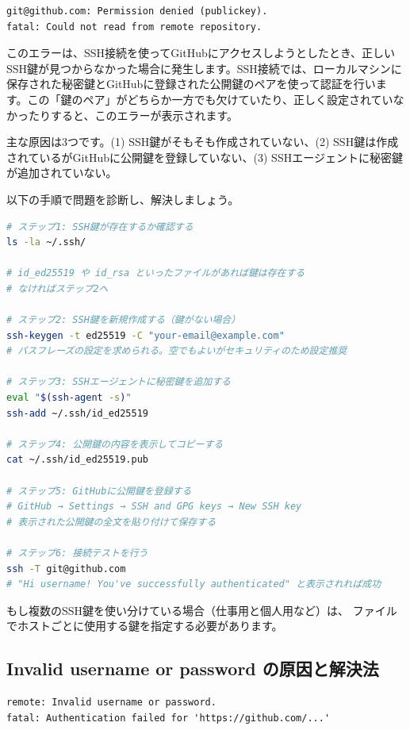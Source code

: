 \begin{lstlisting}[language={}]
git@github.com: Permission denied (publickey).
fatal: Could not read from remote repository.
\end{lstlisting}

このエラーは、SSH接続を使ってGitHubにアクセスしようとしたとき、正しいSSH鍵が見つからなかった場合に発生します。SSH接続では、ローカルマシンに保存された秘密鍵とGitHubに登録された公開鍵のペアを使って認証を行います。この「鍵のペア」がどちらか一方でも欠けていたり、正しく設定されていなかったりすると、このエラーが表示されます。

主な原因は3つです。(1) SSH鍵がそもそも作成されていない、(2) SSH鍵は作成されているがGitHubに公開鍵を登録していない、(3) SSHエージェントに秘密鍵が追加されていない。

以下の手順で問題を診断し、解決しましょう。

\begin{lstlisting}[language=bash]
# ステップ1: SSH鍵が存在するか確認する
ls -la ~/.ssh/

# id_ed25519 や id_rsa といったファイルがあれば鍵は存在する
# なければステップ2へ

# ステップ2: SSH鍵を新規作成する（鍵がない場合）
ssh-keygen -t ed25519 -C "your-email@example.com"
# パスフレーズの設定を求められる。空でもよいがセキュリティのため設定推奨

# ステップ3: SSHエージェントに秘密鍵を追加する
eval "$(ssh-agent -s)"
ssh-add ~/.ssh/id_ed25519

# ステップ4: 公開鍵の内容を表示してコピーする
cat ~/.ssh/id_ed25519.pub

# ステップ5: GitHubに公開鍵を登録する
# GitHub → Settings → SSH and GPG keys → New SSH key
# 表示された公開鍵の全文を貼り付けて保存する

# ステップ6: 接続テストを行う
ssh -T git@github.com
# "Hi username! You've successfully authenticated" と表示されれば成功
\end{lstlisting}

もし複数のSSH鍵を使い分けている場合（仕事用と個人用など）は、 ファイルでホストごとに使用する鍵を指定する必要があります。

\subsection{Invalid username or password の原因と解決法}

\begin{lstlisting}[language={}]
remote: Invalid username or password.
fatal: Authentication failed for 'https://github.com/...'
\end{lstlisting}


